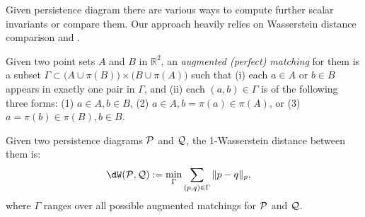 Given persistence diagram there are various ways to compute further scalar invariants or compare them. Our approach heavily relies on Wasserstein distance comparison and \cite{MTopDiv}.

\begin{theorem}\label{def:dWperDV2}
Given two point sets $A$ and $B$ in $\mathbb{R}^2$, an \emph{augmented (perfect) matching} for them is a subset $\Gamma \subset \big(A \cup \pi(B)\big) \times \big(B \cup \pi(A)\big)$ such that 
(i) each $a\in A$ or $b\in B$ appears in exactly one pair in $\Gamma$, and (ii) each $(a,b) \in \Gamma$ is of the following three forms: (1) $a\in A, b\in B$, (2) $a\in A, b = \pi(a) \in \pi(A)$, or (3) $a = \pi(b) \in \pi(B), b\in B$. 

Given two persistence diagrams ${\mathcal{P}}$ and ${\mathcal{Q}}$, the 1-Wasserstein distance between them is: 
\begin{align} 
\dW(\perD, \anotherperD) &:= \min_{\Gamma} \sum_{(p,q)\in \Gamma} \|p - q\|_p, 
\end{align}
where $\Gamma$ ranges over all possible augmented matchings for ${\mathcal{P}}$ and ${\mathcal{Q}}$. 
\end{theorem}
